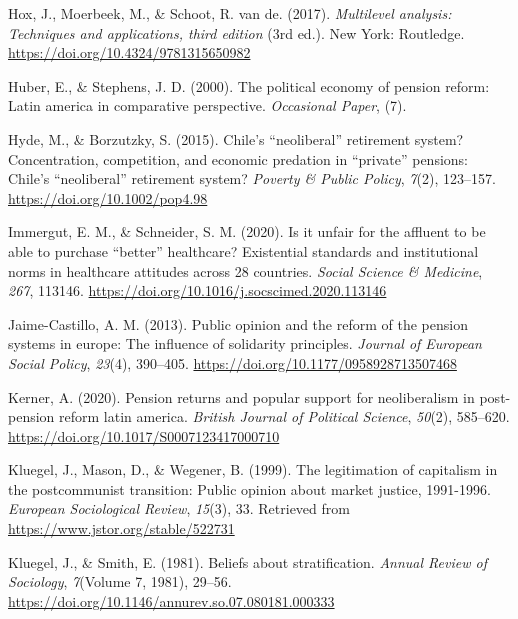 \documentclass[
  12pt,
]{article}
\newlength{\cslhangindent}
\newenvironment{CSLReferences}[2] %
 {\begin{list}{}{%
  \setlength{\itemindent}{0pt}
  \setlength{\leftmargin}{0pt}
  \setlength{\parsep}{0pt}
  \ifodd #1
   \setlength{\leftmargin}{\cslhangindent}
   \setlength{\itemindent}{-1\cslhangindent}
  \fi
  \setlength{\itemsep}{#2\baselineskip}}}
 {\end{list}}
\begin{document}
\begin{CSLReferences}{1}{0}
Hox, J., Moerbeek, M., \& Schoot, R. van de. (2017). \emph{Multilevel
analysis: Techniques and applications, third edition} (3rd ed.). New
York: Routledge. \url{https://doi.org/10.4324/9781315650982}

Huber, E., \& Stephens, J. D. (2000). The political economy of pension
reform: Latin america in comparative perspective. \emph{Occasional
Paper}, (7).

Hyde, M., \& Borzutzky, S. (2015). Chile's {``neoliberal''} retirement
system? Concentration, competition, and economic predation in
{``private''} pensions: Chile's {``neoliberal''} retirement system?
\emph{Poverty \& Public Policy}, \emph{7}(2), 123--157.
\url{https://doi.org/10.1002/pop4.98}

Immergut, E. M., \& Schneider, S. M. (2020). Is it unfair for the
affluent to be able to purchase {``better''} healthcare? Existential
standards and institutional norms in healthcare attitudes across 28
countries. \emph{Social Science \& Medicine}, \emph{267}, 113146.
\url{https://doi.org/10.1016/j.socscimed.2020.113146}

Jaime-Castillo, A. M. (2013). Public opinion and the reform of the
pension systems in europe: The influence of solidarity principles.
\emph{Journal of European Social Policy}, \emph{23}(4), 390--405.
\url{https://doi.org/10.1177/0958928713507468}

Kerner, A. (2020). Pension returns and popular support for neoliberalism
in post-pension reform latin america. \emph{British Journal of Political
Science}, \emph{50}(2), 585--620.
\url{https://doi.org/10.1017/S0007123417000710}

Kluegel, J., Mason, D., \& Wegener, B. (1999). The legitimation of
capitalism in the postcommunist transition: Public opinion about market
justice, 1991-1996. \emph{European Sociological Review}, \emph{15}(3),
33. Retrieved from \url{https://www.jstor.org/stable/522731}

Kluegel, J., \& Smith, E. (1981). Beliefs about stratification.
\emph{Annual Review of Sociology}, \emph{7}(Volume 7, 1981), 29--56.
\url{https://doi.org/10.1146/annurev.so.07.080181.000333}


\end{CSLReferences}
\end{document}
